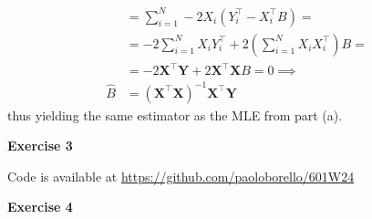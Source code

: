 \documentclass[10pt,notitlepage]{article}
\newcommand{\MBlue}[1]{{\color{MBlue}#1}}
\newcommand{\Xv}{\mathbf{X}}
\newcommand{\Yv}{\mathbf{Y}}
\begin{document}
\begin{exercise}[Solution]
\begin{enumerate}[(a)]
\begin{align*}
                        &= \sum_{i=1}^{N}-2 X_i \left(Y_i^\top - X_i^\top B\right) = \\
                        &= -2\sum_{i=1}^{N}X_i Y_i^\top + 2 \left(\sum_{i=1}^{N} X_i X_i^\top\right) B = \\
                        &= -2 \Xv^\top\Yv + 2 \Xv^\top\Xv B = 0 \implies\\
                        \hat{B} &= \left(\Xv^\top\Xv\right)^{-1}\Xv^\top\Yv
                    \end{align*}
                    thus yielding the same estimator as the MLE from part (a).
        \end{enumerate}
    \end{exercise}

    \newpage
    \textbf{\large \MBlue{Exercise 3}}
    \vskip10pt
    \noindent
	\begin{exercise}[Solution]
        Code is available at \url{https://github.com/paoloborello/601W24}
    \end{exercise}

    \newpage
    \textbf{\large \MBlue{Exercise 4}}
    \vskip10pt
    \noindent
	\begin{exercise}[Solution]

    \end{exercise}
\end{document}

